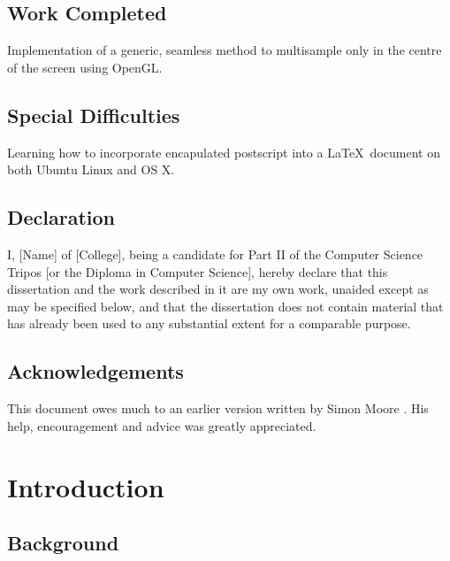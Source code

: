 \documentclass[12pt,a4paper,twoside,openright]{report}
\begin{document}
\section*{Work Completed}

Implementation of a generic, seamless method to multisample only in the centre of the screen using OpenGL.


\section*{Special Difficulties}

Learning how to incorporate encapulated postscript into a \LaTeX\
document on both Ubuntu Linux and OS X.
 
\newpage
\section*{Declaration}

I, [Name] of [College], being a candidate for Part II of the Computer
Science Tripos [or the Diploma in Computer Science], hereby declare
that this dissertation and the work described in it are my own work,
unaided except as may be specified below, and that the dissertation
does not contain material that has already been used to any substantial
extent for a comparable purpose.

\bigskip
{}

\medskip
{}

\tableofcontents

\listoffigures

\newpage
\section*{Acknowledgements}

This document owes much to an earlier version written by Simon Moore
\cite{Moore95}.  His help, encouragement and advice was greatly 
appreciated.


\pagestyle{headings}

\chapter{Introduction}

\section{Background}
\end{document}

